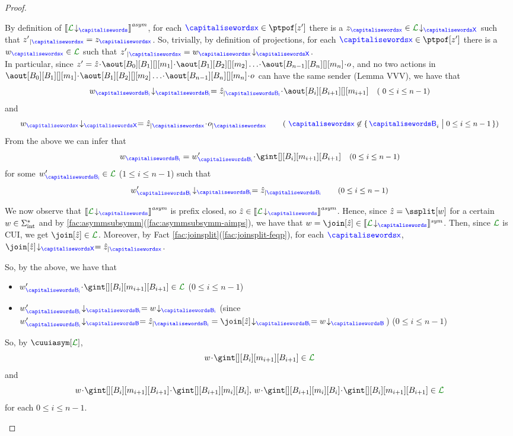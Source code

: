 \begin{proof}
\begin{description}
 By definition of $\asem{\proj{\clang}{}}$, 
for each 
$\px\in\ptpof[{z'}]$  there is a $z_{\px}\in\proj{\clang}{X}$ such that
$\filter{z'}{\px}=z_{\px}$. So, trivially, by definition of projections,
for each $\px\in\ptpof[z']$  there is a $\acword_{\px}\in{\clang}$ such that
$\filter{z'}{\px}=\proj{\acword_{\px}}{X}$.\\
 In particular,
 since $z'=\hat z \cat\aout[B_0][B_1][][m_1]\cat\aout[B_1][B_2][][m_2]\ldots\cat\aout[B_{n-1}][B_n][][m_n]\cat o$, and no two actions in $\aout[B_0][B_1][][m_1]\cat\aout[B_1][B_2][][m_2]\ldots\cat\aout[B_{n-1}][B_n][][m_n]\cat o$ can have the same sender (Lemma VVV), we have that 
  $$
   \proj{\acword_{\ptp[B_{i}]}}{B_{i}}= \filter{\hat z}{\ptp[B_{i}]}\cat\aout[B_{i}][B_{i+1}][][m_{i+1}]
  \quad \text{\small ( $0\leq i \leq n-1$)}$$
  and
  $$\proj{\acword_{\px}}{X} = \filter{\hat z}{\px}\cat  \filter{o}{\px} \qquad 
   \text{\small ( $\px\not\in\Set{\q_i \sst 0\leq i\leq n-1}$)}$$
From the above  we can infer that  
$$
\acword_{\ptp[B_{i}]} = \acword'_{\ptp[B_{i}]}\cat \gint[][{B_i}][m_{i+1}][{B_{i+1}}]
 \quad \text{\small ($0\leq i \leq n-1$)}
$$
      for some $\acword'_{\ptp[B_{i}]} \in\clang$ ($1\leq i \leq n-1$) such that
$$
 \proj{\acword'_{\ptp[B_{i}]}}{B_i}= \filter{\hat z}{\ptp[B_{i}]}  \qquad \text{\small ($0\leq i \leq n-1$)} $$

 We now observe that  $\asem{\proj{\clang}{}}$ is prefix closed, 
so $\hat z\in \asem{\proj{\clang}{}}$. 
Hence, since $\hat z = \ssplit[\acword]$ for a certain $w\in\Sigma_{\text{int}}^*$ and by  
\cref{fac:asymmsubsymm}(\ref{fac:asymmsubsymm-aimps}), we have that
$\acword=\join[\hat z]\in\ssem{\proj{\clang}{}}$. Then,
since $\clang$ is CUI, we get $\join[\hat z]\in\clang$. 
Moreover, by Fact \ref{fac:joinsplit}(\ref{fac:joinsplit-feqp}), for each $\px$,
$\proj{\join[\hat z]}{X}=\filter{\hat z}{\px}$. 


So, by the above, we have that
\begin{itemize}
\item
$\acword'_{\ptp[B_{i}]}\cat\gint[][B_i][m_{i+1}][B_{i+1}]\in\clang$   \qquad  
     {\small  ($0\leq i \leq n-1$)} 
\item
$\proj{\acword'_{\ptp[B_{i}]}}{B_i} = \proj{\acword}{B_i}$\quad 
{\small (since $\proj{\acword'_{\ptp[B_{i}]}}{B}=\filter{\hat z}{\ptp[B_{i}]}=\proj{\join[\hat z]}{B_i}=\proj{\acword}{B}$) \quad ($0\leq i \leq n-1$) }
\end{itemize} 
So, by $\cuuiasym[\clang]$,  
$$\acword\cat\gint[][B_i][m_{i+1}][{B_{i+1}}]
\in\clang$$
and
$$\acword\cat\gint[][B_i][m_{i+1}][{B_{i+1}}]\cat \gint[][{B_{i+1}}][m_{i}][B_i],\,%
\acword\cat \gint[][{B_{i+1}}][m_{i}][B_i]\cat\gint[][B_i][m_{i+1}][{B_{i+1}}]%
\in\clang$$
for each $0\leq i \leq n-1$.


\end{description}
\end{proof}
